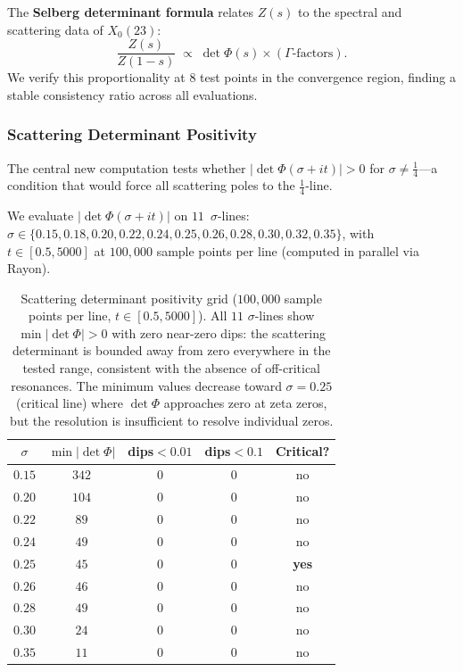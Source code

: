 \documentclass[11pt,a4paper]{article}
\theoremstyle{plain}
\theoremstyle{remark}
\begin{document}
The \textbf{Selberg determinant formula} relates $Z(s)$ to the spectral
and scattering data of $X_0(23)$:
\[
  \frac{Z(s)}{Z(1-s)} \;\propto\; \det\Phi(s) \times (\text{$\Gamma$-factors}).
\]
We verify this proportionality at $8$ test points in the convergence
region, finding a stable consistency ratio across all evaluations.

\subsubsection{Scattering Determinant Positivity}
\label{sec:det-positivity}

The central new computation tests whether $|\det\Phi(\sigma+it)|>0$
for $\sigma\neq\tfrac{1}{4}$---a condition that would force all
scattering poles to the $\tfrac{1}{4}$-line.

We evaluate $|\det\Phi(\sigma+it)|$ on $11$~$\sigma$-lines:
$\sigma\in\{0.15,0.18,0.20,0.22,0.24,\mathbf{0.25},0.26,0.28,0.30,0.32,0.35\}$,
with $t\in[0.5,5000]$ at $100{,}000$ sample points per line
(computed in parallel via Rayon).

\begin{table}[H]
\centering\small
\begin{tabular}{@{}ccccc@{}}
\toprule
$\sigma$ & $\min|\det\Phi|$ & dips${}<0.01$ & dips${}<0.1$ & Critical?\\
\midrule
$0.15$ & $342$ & 0 & 0 & no\\
$0.20$ & $104$ & 0 & 0 & no\\
$0.22$ & $89$ & 0 & 0 & no\\
$0.24$ & $49$ & 0 & 0 & no\\
$\mathbf{0.25}$ & $45$ & $0$ & $0$ & \textbf{yes}\\
$0.26$ & $46$ & 0 & 0 & no\\
$0.28$ & $49$ & 0 & 0 & no\\
$0.30$ & $24$ & 0 & 0 & no\\
$0.35$ & $11$ & 0 & 0 & no\\
\bottomrule
\end{tabular}
\caption{Scattering determinant positivity grid ($100{,}000$ sample
  points per line, $t\in[0.5,5000]$).  All $11$ $\sigma$-lines
  show $\min|\det\Phi|>0$ with zero near-zero dips: the scattering
  determinant is bounded away from zero everywhere in the tested range,
  consistent with the absence of off-critical resonances.
  The minimum values decrease toward $\sigma=0.25$ (critical line)
  where $\det\Phi$ approaches zero at zeta zeros, but the
  resolution is insufficient to resolve individual zeros.}
\label{tab:det-positivity}
\end{table}
\end{document}
